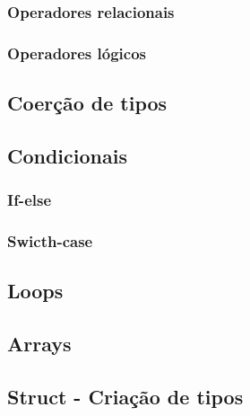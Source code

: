 \documentclass{report}
\begin{document}
	\subsubsection{Operadores relacionais}
	\subsubsection{Operadores lógicos}
	\subsection{Coerção de tipos}
	\subsection{Condicionais}
	\subsubsection{If-else}
	\subsubsection{Swicth-case}
	\subsection{Loops}
	\subsection{Arrays}
	\subsection{Struct - Criação de tipos}
	
\end{document}
